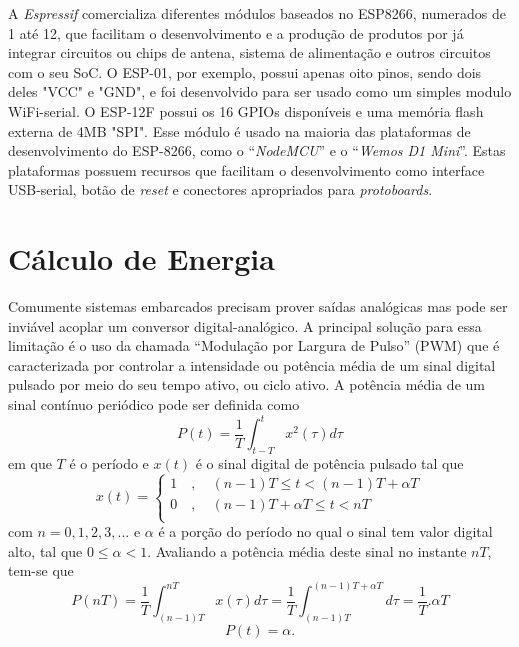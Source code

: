 A \textit{Espressif} comercializa diferentes módulos baseados no ESP8266, numerados de 1 até 12, que facilitam o desenvolvimento e a produção de produtos por já integrar circuitos ou chips de antena, sistema de alimentação e outros circuitos com o seu SoC. O ESP-01, por exemplo, possui apenas oito pinos, sendo dois deles "VCC" e "GND", e foi desenvolvido para ser usado como um simples modulo WiFi-serial. O ESP-12F possui os 16 GPIOs disponíveis e uma memória flash externa de 4MB "SPI". Esse módulo é usado na maioria das plataformas de desenvolvimento do ESP-8266, como o “\textit{NodeMCU}” e o “\textit{Wemos D1 Mini}”. Estas plataformas possuem recursos que facilitam o desenvolvimento como interface USB-serial, botão de \textit{reset} e conectores apropriados para \textit{protoboards}.

\section{Cálculo de Energia}

Comumente sistemas embarcados precisam prover saídas analógicas mas pode ser inviável acoplar um conversor digital-analógico. A principal solução para essa limitação é o uso da chamada ``Modulação por Largura de Pulso'' (PWM) que é caracterizada por controlar a intensidade ou potência média de um sinal digital pulsado por meio do seu tempo ativo, ou ciclo ativo. A potência média de um sinal contínuo periódico pode ser definida como
\begin{equation}
\label{eq:en_1}
P(t) = \frac{1}{T} \int_{t-T}^t x^2(\tau)d\tau
\end{equation}
em que $T$ é o período e $x(t)$ é o sinal digital de potência pulsado tal que
\begin{equation}
    \label{eq:en_2}
    x(t) =  \left\{
            \begin{array}{ll}
                1 \quad , \quad (n-1)T \leq t < (n-1)T+\alpha T \\ %
                0 \quad , \quad (n-1)T+\alpha T \leq t < n T\\
            \end{array}
            \right.
\end{equation}
 com $n = 0, 1, 2, 3, ...$ e $\alpha$ é a porção do período no qual o sinal tem valor digital alto, tal que $0 \leq \alpha < 1$. Avaliando a potência média deste sinal no instante $nT$, tem-se que 
\begin{equation}
    \label{eq:en_3}
    P(nT) = \frac{1}{T} \int_{(n-1)T}^{nT}x(\tau)d\tau = \frac{1}{T} \int_{(n-1)T}^{(n-1)T+\alpha T}d\tau = \frac{1}{T}.\alpha T
\end{equation}
\begin{equation}
    \label{eq:en_4}
    P(t) = \alpha.
\end{equation}

